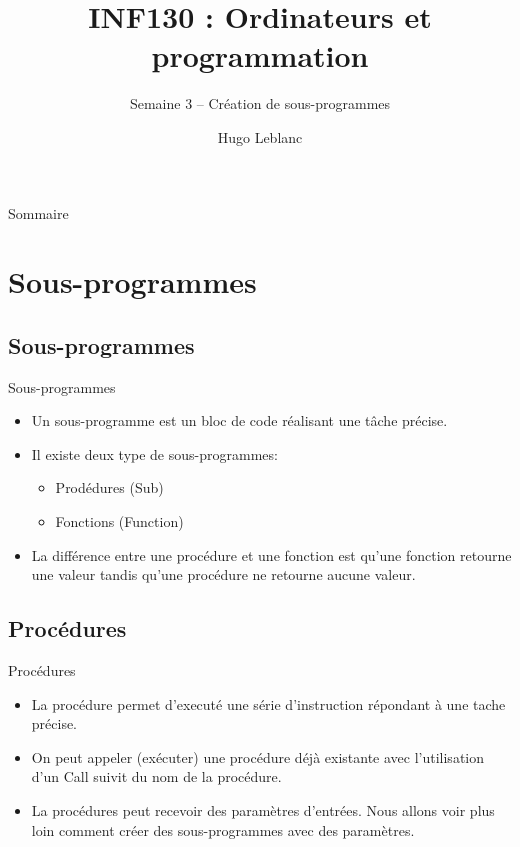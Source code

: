\documentclass[aspectratio=169,usenames,dvipsnames]{beamer}
\title{INF130 : Ordinateurs et programmation}
\subtitle{Semaine 3 – Création de sous-programmes}
\author{Hugo Leblanc}
\begin{document}
    \maketitle

    \begin{frame}{Sommaire}
        \tableofcontents
    \end{frame}

    \section{Sous-programmes}
    \subsection{Sous-programmes}
    \begin{frame}{Sous-programmes}
        \begin{itemize}
            \item Un sous-programme est un bloc de code réalisant une tâche précise. 
            \item Il existe deux type de sous-programmes:           
            \begin{itemize}
                \item Prodédures (Sub)
                \item Fonctions (Function)
            \end{itemize}
            \item La différence entre une procédure et une fonction est qu'une fonction retourne une valeur tandis qu'une procédure ne retourne aucune valeur.
        \end{itemize}
    \end{frame}
    \subsection{Procédures}
    \begin{frame}{Procédures}
        \begin{itemize}
            \item La procédure permet d’executé une série d’instruction répondant à une tache précise.
            \item On peut appeler (exécuter) une procédure déjà existante avec l’utilisation d’un Call suivit du nom de la procédure.
            \item La procédures peut recevoir des paramètres d’entrées. Nous allons voir plus loin comment créer des sous-programmes avec des paramètres.
        \end{itemize}
    \end{frame}
\end{document}
